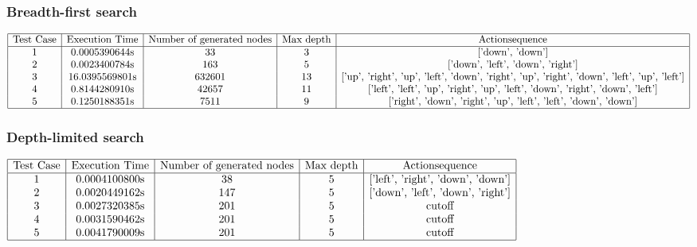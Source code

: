 \documentclass{report}
\begin{document}
                \subsubsection{Breadth-first search}
                    $\begin{array}{|c|c|c|c|c|}
                        \hline
                        \text{Test Case} & \text{Execution Time} & \text{Number of generated nodes} & \text{Max depth} & \text {Actionsequence}\\
                        \hline
                        \text{1} & \text{0.0005390644s} & \text{33} & \text{3} & \text{['down', 'down']} \\
                        \text{2} & \text{0.0023400784s} & \text{163} & \text{5} & \text{['down', 'left', 'down', 'right']} \\
                        \text{3} & \text{16.0395569801s} & \text{632601} & \text{13} & \text{['up', 'right', 'up', 'left', 'down', 'right', 'up', 'right', 'down', 'left', 'up', 'left']} \\
                        \text{4} & \text{0.8144280910s} & \text{42657} & \text{11} & \text{['left', 'left', 'up', 'right', 'up', 'left', 'down', 'right', 'down', 'left']} \\
                        \text{5} & \text{0.1250188351s} & \text{7511} & \text{9} & \text{['right', 'down', 'right', 'up', 'left', 'left', 'down', 'down']} \\
                        \hline
                    \end{array}$
                \subsubsection{Depth-limited search}
                    $\begin{array}{|c|c|c|c|c|}
                        \hline
                        \text{Test Case} & \text{Execution Time} & \text{Number of generated nodes} & \text{Max depth} & \text {Actionsequence}\\
                        \hline
                        \text{1} & \text{0.0004100800s} & \text{38} & \text{5} & \text{['left', 'right', 'down', 'down']} \\
                        \text{2} & \text{0.0020449162s} & \text{147} & \text{5} & \text{['down', 'left', 'down', 'right']} \\
                        \text{3} & \text{0.0027320385s} & \text{201} & \text{5} & \text{cutoff} \\
                        \text{4} & \text{0.0031590462s} & \text{201} & \text{5} & \text{cutoff} \\
                        \text{5} & \text{0.0041790009s} & \text{201} & \text{5} & \text{cutoff} \\
                        \hline
                    \end{array}$
\end{document}
